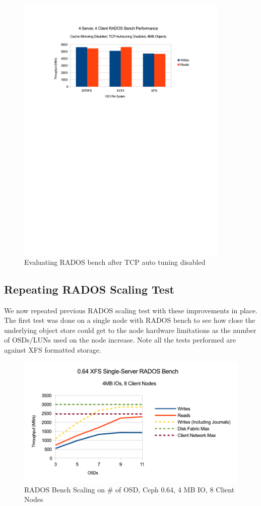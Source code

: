 \documentclass{article}
\begin{document}
\begin{figure}[htb]
\centering
\includegraphics[width=4.0in]{rados-after-ddn-tcptune}
\caption{Evaluating RADOS bench after TCP auto tuning disabled}
\label{fig:rados-tcp-auto-disabled}
\end{figure}




\subsection{Repeating RADOS Scaling Test}

We now repeated previous RADOS scaling test with these improvements in place.
The first test was done on a single node with RADOS bench to see how close the
underlying object store could get to the node hardware limitations as the number
of OSDs/LUNs used on the node increase. Note all the tests performed are against
XFS formatted storage.

\begin{figure}[htb]
\centering
\includegraphics[width=5in]{rados-064-osd}
\caption{RADOS Bench Scaling on \# of OSD, Ceph 0.64, 4 MB IO, 8 Client Nodes}
\label{fig:rados-064-osd}
\end{figure}
\end{document}
